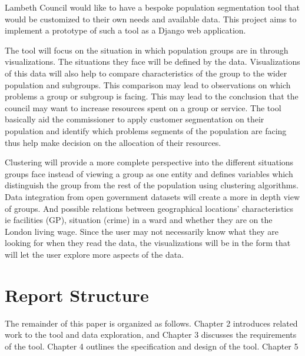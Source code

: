 \documentclass[11pt]{informatics-report}
\begin{document}
Lambeth Council would like to have a bespoke population segmentation tool that would be customized to their own needs and available data. This project aims to implement a prototype of such a tool as a Django web application.\par

The tool will focus on the situation in which population groups are in through visualizations. The situations they face will be defined by the data. Visualizations of this data will also help to compare characteristics of the group to the wider population and subgroups. This comparison may lead to observations on which problems a group or subgroup is facing. This may lead to the conclusion that the council may want to increase resources spent on a group or service. The tool basically aid the commissioner to apply customer segmentation on their population and identify which problems segments of the population are facing thus help make decision on the allocation of their resources.\par

Clustering will provide a more complete perspective into the different situations groups face instead of viewing a group as one entity and defines variables which distinguish the group from the rest of the population using clustering algorithms. Data integration from open government datasets will create a more in depth view of groups. And possible relations between geographical locations’ characteristics ie facilities (GP), situation (crime) in a ward and whether they are on the London living wage. Since the user may not necessarily know what they are looking for when they read the data, the visualizations will be in the form that will let the user explore more aspects of the data.\par

\section{Report Structure}
The remainder of this paper is organized as follows. Chapter 2 introduces related work to the tool and data exploration, and Chapter 3 discusses the requirements of the tool. Chapter 4 outlines the specification and design of the tool. Chapter 5












\appendix



\end{document}
